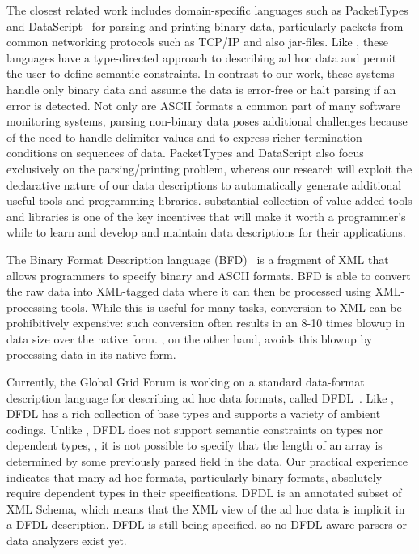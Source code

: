 \documentclass[11pt]{article}
\begin{document}
The closest related work includes domain-specific
languages such as PacketTypes~\cite{sigcomm00} and DataScript~\cite{gpce02} 
for parsing and printing binary data, particularly packets
from common networking protocols such as \textsc{TCP/IP} and also
\java{} jar-files.  Like \pads{}, these languages have a type-directed
approach to describing ad hoc data and permit the user to define
semantic constraints.  In contrast to our work, these systems handle
only binary data and assume the data is error-free or halt parsing if
an error is detected.  Not only are ASCII formats a common part of
many software monitoring systems, parsing non-binary data poses additional
challenges because of the need to handle delimiter values and to
express richer termination conditions on sequences of data. 
PacketTypes and DataScript also focus exclusively on the 
parsing/printing problem,
whereas our research will exploit the declarative nature of our data
descriptions to automatically generate additional useful tools and
programming libraries.  \pads{} substantial 
collection of value-added tools and libraries is 
one of the key incentives that will make it
worth a programmer's while to learn \pads{}
and develop and maintain data descriptions for their applications.

The Binary Format Description language (BFD)~\cite{bfd} is a fragment of
XML that allows programmers to specify binary and ASCII formats.  BFD
is able to convert the raw data into XML-tagged data where it can then be
processed using XML-processing tools.  While this is useful for many
tasks, conversion to XML can be prohibitively expensive:  such conversion
often results in an 8-10 times blowup in data size over the native form.
\pads{}, on the other hand, avoids this blowup by processing data in its 
native form.

Currently, the Global Grid Forum is working on a standard
data-format description language for describing ad hoc data formats,
called DFDL~\cite{dfdl-proposal,dfdl-primer}.  Like \pads{},
DFDL{} has a rich collection of base types and supports a variety of
ambient codings.  Unlike \pads{}, DFDL{} does not support semantic
constraints on types nor dependent types, \eg{}, it is not possible to
specify that the length of an array is determined by some previously parsed field in the
data.  Our practical experience indicates that many ad hoc formats,
particularly binary formats, absolutely require dependent types in their
specifications.  DFDL{} is an annotated subset of XML{} Schema, which means
that the XML{} view of the ad hoc data is implicit in a DFDL{}
description.  DFDL{} is still being specified, so no DFDL-aware
parsers or data analyzers exist yet.  
\end{document}
